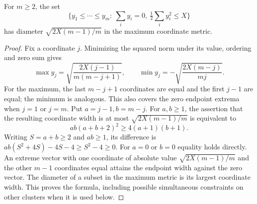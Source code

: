 \begin{lemma}\label{lem:ordered}
For $m\ge2$, the set
\[
 \{y_1\le\cdots\le y_m:\ \sum_i y_i=0,\ \tfrac12\sum_i y_i^2\le X\}
\]
has diameter $\sqrt{2X(m-1)/m}$ in the maximum coordinate metric.
\end{lemma}
\begin{proof}
Fix a coordinate $j$. Minimizing the squared norm under its value,
ordering and zero sum gives
\[
 \max y_j=\sqrt{\frac{2X(j-1)}{m(m-j+1)}},\qquad
 \min y_j=-\sqrt{\frac{2X(m-j)}{mj}}.
\]
For the maximum, the last $m-j+1$ coordinates are equal and the first
$j-1$ are equal; the minimum is analogous. This also covers the zero
endpoint extrema when $j=1$ or $j=m$. Put $a=j-1,b=m-j$.
For $a,b\ge1$, the assertion that the resulting coordinate width is
at most $\sqrt{2X(m-1)/m}$ is equivalent to
\[
 ab(a+b+2)^2\ge4(a+1)(b+1).
\]
Writing $S=a+b\ge2$ and $ab\ge1$, its difference is
$ab(S^2+4S)-4S-4\ge S^2-4\ge0$.
For $a=0$ or $b=0$ equality holds directly. An extreme vector with one
coordinate of absolute value $\sqrt{2X(m-1)/m}$ and the other $m-1$
coordinates equal attains the endpoint width against the zero vector.
The diameter of a subset in the maximum metric is its largest coordinate
width. This proves the formula, including possible simultaneous
constraints on other clusters when it is used below.
\end{proof}

